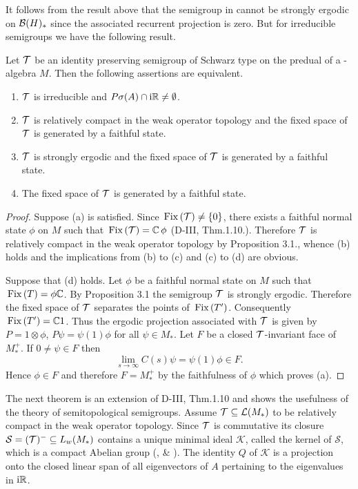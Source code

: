 It follows from the result above that the semigroup in \citet{evans:1977} cannot be strongly ergodic on $\mathcal{B}(H)_{*}$ since the associated recurrent projection is zero.
But for irreducible semigroups we have the following result.
\begin{proposition}\label{prop:d4-3.4}
Let $\mathcal{T}$ be an identity preserving semigroup of Schwarz type on the predual of a \WA-algebra $M$.
Then the following assertions are equivalent.
\begin{enumerate}[\upshape (a)]
\item
$\mathcal{T}$ is irreducible and $P\sigma(A) \cap \mathrm{i}\mathbb{R} \neq \emptyset$.

\item
$\mathcal{T}$ is relatively compact in the weak operator topology and the fixed space of\/ $\mathcal{T}$ is generated by a faithful state.

\item
$\mathcal{T}$ is strongly ergodic and the fixed space of\/ $\mathcal{T}$ is generated by a faithful state.

\item
The fixed space of\/ $\mathcal{T}$ is generated by a faithful state.
\end{enumerate}
\end{proposition}
\begin{proof}
Suppose (a) is satisfied.
Since $\mathop{}\mathrm{Fix}\left(\mathcal{T}\right) \neq \{0\}$, there exists a faithful normal state $\phi$ on $M$ such that $\mathop{}\mathrm{Fix}\left(\mathcal{T}\right) = \mathbb{C} \,\phi$ (D-III, Thm.1.10.).
Therefore $\mathcal{T}$ is relatively compact in the weak operator topology by Proposition 3.1., whence (b) holds and the  implications from (b) to (c) and (c) to (d) are obvious.

Suppose that (d) holds.
Let $\phi$ be a faithful normal state on $M$ such that $\mathop{}\mathrm{Fix}\left(T\right) = \phi\mathbb{C}$.
By Proposition 3.1 the semigroup $\mathcal{T}$ is strongly ergodic.
Therefore the fixed space of\/ $\mathcal{T}$ separates the points of $\mathop{}\mathrm{Fix}\left(T'\right)$.
Consequently $\mathop{}\mathrm{Fix}\left(T'\right) = \mathbb{C}1$.
Thus the ergodic projection associated with $\mathcal{T}$ is given by $P = 1 \otimes \phi$, \ie $P\psi = \psi(1)\phi$ for all $\psi \in M_{*}$.
Let $F$ be a closed $\mathcal{T}$-invariant face of $M_{*}^{+}$.
If $0 \neq \psi \in F$ then
\[
\lim_{s \to \infty} C(s)\psi = \psi(1)\phi \in F.
\]
Hence $\phi \in F$ and therefore $F = M_{*}^{+}$ by the faithfulness of $\phi$ which proves (a).
\end{proof}
The next theorem is an extension of D-III, Thm.1.10 and shows the usefulness of the theory of semitopological semigroups.
Assume $\mathcal{T} \subseteq \mathcal{L}(M_{*})$ to be relatively compact in the weak operator topology. 
Since $\mathcal{T}$ is commutative its closure $\mathcal{S}  = (\mathcal{T})^{-} \subseteq L_{w}(M_{*})$ contains a unique minimal ideal $\mathcal{K}$, called the kernel of $\mathcal{S}$, which is a compact Abelian group (\citet{deleeuw:1961}, \citet{junghenn:1971} \& \citet[§ 2.4]{krengel:1985}).
The identity $Q$ of $\mathcal{K}$ is a projection onto the closed linear span of all eigenvectors of $ A $ pertaining to the eigenvalues in $ \mathrm{i} \mathbb{R} $. 

